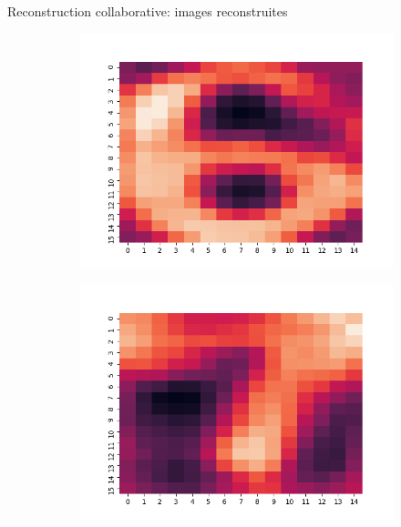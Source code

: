\documentclass[hyperref={pdfpagelabels=false}]{beamer}
\begin{document}
\begin{frame}{Reconstruction collaborative: images reconstruites}
\begin{figure}[h]
\begin{subfigure}[c]{0.18\textwidth}
                \includegraphics[scale=.12]{6}
            \end{subfigure}
            \begin{subfigure}[c]{0.18\textwidth}
                \includegraphics[scale=.12]{7}
            \end{subfigure}
            \begin{subfigure}[c]{0.18\textwidth}

\end{subfigure}
\end{figure}
\end{frame}
\end{document}
